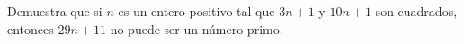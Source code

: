 Demuestra que si $n$ es un entero positivo tal que $3n + 1$ y $10n + 1$ son cuadrados, entonces $29n + 11$ no puede ser un número primo.